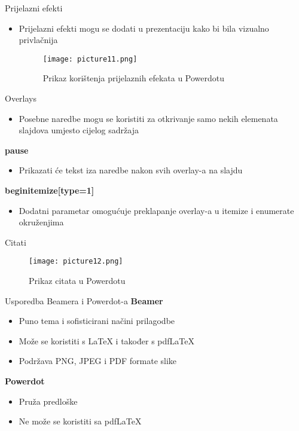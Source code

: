 \documentclass{beamer}
\begin{document}
 \begin{frame}{Prijelazni efekti}
 		\begin{itemize}
     			\item Prijelazni efekti mogu se dodati u prezentaciju kako bi bila vizualno privlačnija
 		\begin{figure}
 			\texttt{[image: picture11.png]}
 			\caption{Prikaz korištenja prijelaznih efekata u Powerdotu}
 		\end{figure}
 		\end{itemize}
 \end{frame}

 \begin{frame}{Overlays}
  		\begin{itemize}
     			\item Posebne naredbe mogu se koristiti za otkrivanje samo nekih elemenata slajdova umjesto cijelog sadržaja
 		\end{itemize}
 \textbf{pause}
 		\begin{itemize}
     			\item Prikazati će tekst iza naredbe nakon svih overlay-a na slajdu 
 		\end{itemize}
 \textbf{begin{itemize}[type=1]}
 		\begin{itemize}
     			\item Dodatni parametar omogućuje preklapanje overlay-a u itemize i enumerate okruženjima
 		\end{itemize}
 \end{frame}

 \begin{frame}{Citati}
 		\begin{figure}
 			\texttt{[image: picture12.png]}
 			\caption{Prikaz citata u Powerdotu}
 		\end{figure}   
 \end{frame}

 \begin{frame}{Usporedba Beamera i Powerdot-a}
 \textbf{Beamer}
 		\begin{itemize}
     			\item Puno tema i sofisticirani načini prilagodbe
     			\item Može se koristiti s LaTeX i također s pdfLaTeX
     			\item Podržava PNG, JPEG i PDF formate slike
 		\end{itemize}
 \textbf{Powerdot}
 		\begin{itemize}
     			\item Pruža predloške
     			\item Ne može se koristiti sa pdfLaTeX
 		\end{itemize}
\end{frame}
\end{document}
